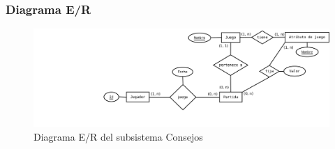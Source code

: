 \subsubsection{Diagrama E/R}

\begin{figure}[H]
\centering
\includegraphics[width=0.9\linewidth]{../Diagramas/pdf/ERConsejos.pdf}
\caption{Diagrama E/R del subsistema Consejos}
\end{figure}
